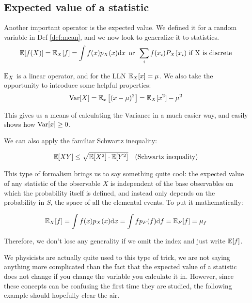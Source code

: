 \subsection{Expected value of a statistic}
Another important operator is the expected value. We defined it for a random variable in Def \ref{def:mean}, and we now look to generalize it to statistics.
	\[
	\mathbb{E}[f(X)] = \mathbb{E}_X[f] = \int f(x)p_X(x)\mathrm{d} x \,\,\, \text{or} \,\,\, \sum_i f(x_i)P_X(x_i) \,\, \text{if X is discrete}
	\]
	
$\mathbb{E}_X$ is a linear operator, and for the LLN $\mathbb{E}_X[x]=\mu$. We also take the opportunity to introduce some helpful properties:
	\[
	\operatorname{Var}[X] = \mathbb{E}_x\left[ (x-\mu)^2 \right] = \mathbb{E}_X[x^2] - \mu^2
	\]

This gives us a means of calculating the Variance in a much easier way, and easily shows how $\operatorname{Var}[x]\geq0$.

We can also apply the familiar Schwartz inequality:

	\[
	\mathbb{E}[XY]\leq\sqrt{\mathbb{E}[X^2]\cdot\mathbb{E}[Y^2]} \quad \text{(Schwartz inequality)}
	\]

This type of formalism brings us to say something quite cool: the expected value of any statistic of the observable $X$ is independent of the base observables on which the probability itself is defined, and instead only depends on the probability in $S$, the space of all the elemental events. To put it mathematically:

	\[
	\mathbb{E}_X[f] = \int f(x)p_X(x)\mathrm{d} x = \int fp_F(f)\mathrm{d} f = \mathbb{E}_F[f] = \mu_f
	\]

Therefore, we don't lose any generality if we omit the index and just write $\mathbb{E}[f]$.


We physicists are actually quite used to this type of trick, we are not saying anything more complicated than the fact that the expected value of a statistic does not change if you change the variable you calculate it in. However, since these concepts can be confusing the first time they are studied, the following example should hopefully clear the air. 

